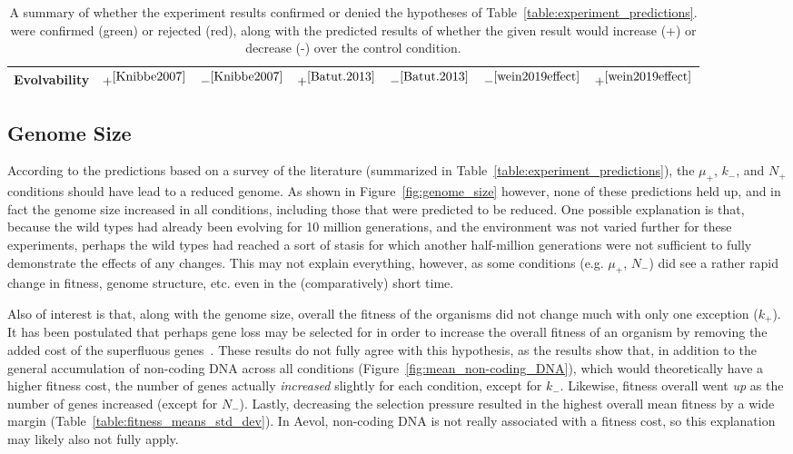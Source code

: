 \begin{table}[H]
\begin{tabular}{|c||c|c|c|c|c|c|}
		\hline
		Evolvability &\cellcolor{green} $+^{\cite{Knibbe2007}}$ &\cellcolor{green} $-^{\cite{Knibbe2007}}$ & \cellcolor{red}  $+^{\cite{Batut.2013}}$ & \cellcolor{red} $-^{\cite{Batut.2013}}$ & $-^{\cite{wein2019effect}}$ & \cellcolor{green} $+^{\cite{wein2019effect}}$ \\
		\hline		
	\end{tabular}
	\caption[Experiment result summary]{A summary of whether the experiment results confirmed or denied the hypotheses of Table~\ref{table:experiment_predictions}.  were confirmed ({\color{green}green}) or rejected ({\color{red}red}), along with the predicted results of whether the given result would increase (+) or decrease (-) over the control condition.}
	\label{table:experiment_results_summary}
\end{table}
\subsection{Genome Size}

According to the predictions based on a survey of the literature (summarized in Table~\ref{table:experiment_predictions}), the $\mu_+$, $k_-$, and $N_+$ conditions should have lead to a reduced genome. As shown in Figure~\ref{fig:genome_size} however, none of these predictions held up, and in fact the genome size increased in all conditions, including those that were predicted to be reduced. One possible explanation is that, because the wild types had already been evolving for 10 million generations, and the environment was not varied further for these experiments, perhaps the wild types had reached a sort of stasis for which another half-million generations were not sufficient to fully demonstrate the effects of any changes. This may not explain everything, however, as some conditions (e.g. $\mu_+$, $N_-$) did see a rather rapid change in fitness, genome structure, etc. even in the (comparatively) short time. 

Also of interest is that, along with the genome size, overall the fitness of the organisms did not change much with only one exception ($k_+$). It has been postulated that perhaps gene loss may be selected for in order to increase the overall fitness of an organism by removing the added cost of the superfluous genes~\cite{koskiniemi2012}. These results do not fully agree with this hypothesis, as the results show that, in addition to the general accumulation of non-coding DNA across all conditions (Figure~\ref{fig:mean_non-coding_DNA}), which would theoretically have a higher fitness cost, the number of genes actually \textit{increased} slightly for each condition, except for $k_-$. Likewise, fitness overall went \textit{up} as the number of genes increased (except for $N_-$). Lastly, decreasing the selection pressure resulted in the highest overall mean fitness by a wide margin (Table~\ref{table:fitness_means_std_dev}). In Aevol, non-coding DNA is not really associated with a fitness cost, so this explanation may likely also not fully apply. 

